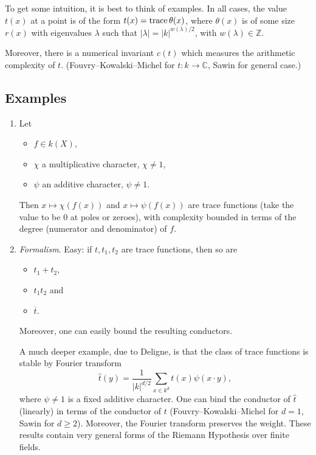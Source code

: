 \documentclass[reqno]{amsart} 
\numberwithin{theorem}{section}
\numberwithin{equation}{section}
\begin{document}
To get some intuition, it is best to think of examples.  In all cases, the value $t(x)$ at a point is of the form $t(x) = \operatorname{trace} \theta(x)$, where $\theta(x)$ is of some size  $r(x)$ with eigenvalues $\lambda$ such that $\lvert \lambda \rvert = \lvert k \rvert^{w(\lambda) / 2}$, with $w(\lambda) \in \mathbb{Z}$.

Moreover, there is a numerical invariant $c(t)$ which measures the arithmetic complexity of $t$.  (Fouvry--Kowalski--Michel for $t : k \rightarrow \mathbb{C}$, Sawin for general case.)

\subsection{Examples}

\begin{enumerate}
\item Let
  \begin{itemize}
  \item $f \in k(X)$,
  \item $\chi$ a multiplicative character, $\chi \neq 1$,
  \item $\psi$ an additive character, $\psi \neq 1$.
  \end{itemize}
  Then $x \mapsto \chi(f(x))$ and $x \mapsto \psi(f(x))$ are trace functions (take the value to be $0$ at poles or zeroes), with complexity bounded in terms of the degree (numerator and denominator) of $f$.
\item \emph{Formalism}.  Easy: if $t, t_1, t_2$ are trace functions, then so are
  \begin{itemize}
  \item $t_1 + t_2$,
  \item $t_1 t_2$ and
  \item $\overline{t}$.
  \end{itemize}
  Moreover, one can easily bound the resulting conductors.

  A much deeper example, due to Deligne, is that the class of trace functions is stable by Fourier transform
  \begin{equation*}
    \hat{t}(y) = \frac{1}{\lvert k \rvert^{d/2}}
    \sum_{x \in k^d} t(x) \psi(x \cdot y),
  \end{equation*}
  where $\psi \neq 1$ is a fixed additive character.  One can bind the conductor of $\hat{t}$ (linearly) in terms of the conductor of $t$ (Fouvry--Kowalski--Michel for $d = 1$, Sawin for $d \geq 2$).  Moreover, the Fourier transform preserves the weight.  These results contain very general forms of the Riemann Hypothesis over finite fields.
\end{enumerate}
\end{document}
